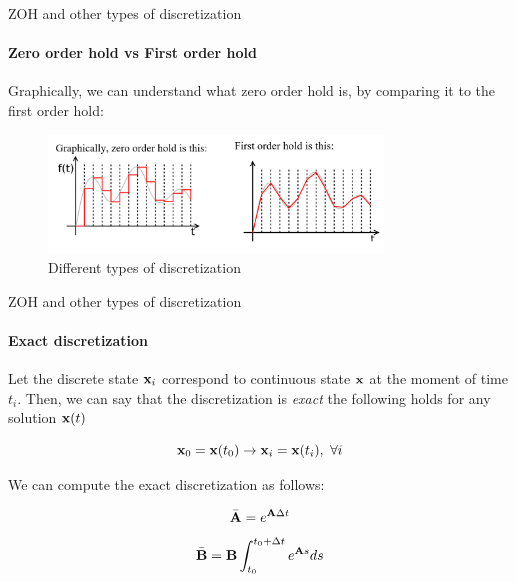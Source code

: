 \documentclass{beamer}
\begin{document}
\begin{frame}{ZOH and other types of discretization}
\framesubtitle{Zero order hold vs First order hold}
\begin{flushleft}

Graphically, we can understand what zero order hold is, by comparing it to the first order hold:

\begin{figure} [h!]
\begin{center}
\includegraphics[width=3.5in]{ZOH.PNG}
\end{center} 
\caption{Different types of discretization} \label{F:ZOH}
\end{figure}

\end{flushleft}
\end{frame}


\begin{frame}{ZOH and other types of discretization}
\framesubtitle{Exact discretization}
\begin{flushleft}

Let the discrete state $\mathbf{x}_i$ correspond to continuous state $\mathbf{x}$ at the moment of time $t_i$. Then, we can say that the discretization is \emph{exact} the following holds for any solution $\mathbf{x}(t)$

\begin{equation}
\mathbf{x}_0 = \mathbf{x}(t_0) \rightarrow 
\mathbf{x}_i = \mathbf{x}(t_i), \ \forall i
\end{equation}

We can compute the exact discretization as follows:

\begin{equation}
\bar{\mathbf{A}} = e^{\mathbf{A} \Delta t}
\end{equation}
\begin{equation}
\bar{\mathbf{B}} = \mathbf{B} \int_{t_0}^{t_0 + \Delta t} e^{\mathbf{A} s} ds
\end{equation}


\end{flushleft}
\end{frame}
\end{document}
